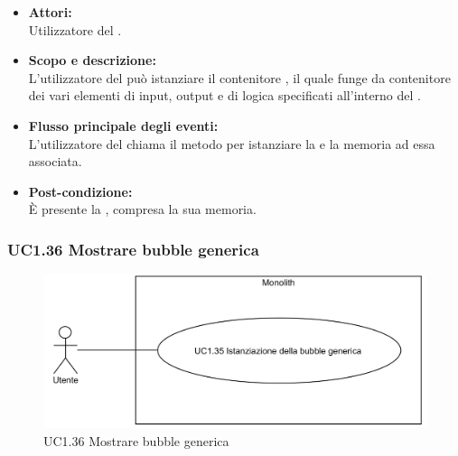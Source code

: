 \begin{itemize}
	\item \textbf{Attori:}
	\\Utilizzatore del .
	\item \textbf{Scopo e descrizione:} 
	\\L'utilizzatore del  può istanziare il contenitore , il quale funge da contenitore dei vari elementi di input, output e di logica specificati all'interno del .
	\item \textbf{Flusso principale degli eventi:}
	\\L'utilizzatore del  chiama il metodo per istanziare la  e la memoria ad essa associata.
	\item \textbf{Post-condizione:}
	\\È presente la , compresa la sua memoria.
\end{itemize}

\subsubsection{UC1.36 Mostrare bubble generica} \label{UC1.36}

\begin{figure}[H]
	\centering
	\includegraphics[width=15cm]{../../documenti/AnalisiDeiRequisiti/Diagrammi_img/uc1_36.png}
	\caption{UC1.36 Mostrare bubble generica}
\end{figure}

